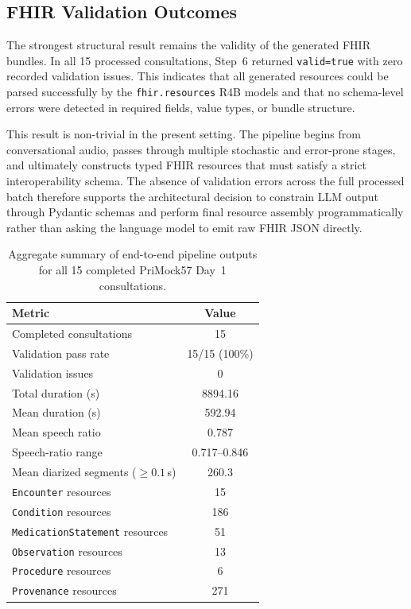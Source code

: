 \subsection{FHIR Validation Outcomes}

The strongest structural result remains the validity of the generated FHIR bundles. In all 15 processed consultations, Step~6 returned \texttt{valid=true} with zero recorded validation issues. This indicates that all generated resources could be parsed successfully by the \texttt{fhir.resources} R4B models and that no schema-level errors were detected in required fields, value types, or bundle structure.

This result is non-trivial in the present setting. The pipeline begins from conversational audio, passes through multiple stochastic and error-prone stages, and ultimately constructs typed FHIR resources that must satisfy a strict interoperability schema. The absence of validation errors across the full processed batch therefore supports the architectural decision to constrain LLM output through Pydantic schemas and perform final resource assembly programmatically rather than asking the language model to emit raw FHIR JSON directly.

\begin{table}[ht]
\centering
\caption{Aggregate summary of end-to-end pipeline outputs for all 15 completed PriMock57 Day~1 consultations.}
\label{tab:results-summary}
\begin{tabular}{lc}
\hline
Metric & Value \\
\hline
Completed consultations & 15 \\
Validation pass rate & 15/15 (100\%) \\
Validation issues & 0 \\
Total duration (s) & 8894.16 \\
Mean duration (s) & 592.94 \\
Mean speech ratio & 0.787 \\
Speech-ratio range & 0.717--0.846 \\
Mean diarized segments ($\geq 0.1$\,s) & 260.3 \\
\texttt{Encounter} resources & 15 \\
\texttt{Condition} resources & 186 \\
\texttt{MedicationStatement} resources & 51 \\
\texttt{Observation} resources & 13 \\
\texttt{Procedure} resources & 6 \\
\texttt{Provenance} resources & 271 \\
\hline
\end{tabular}
\end{table}

